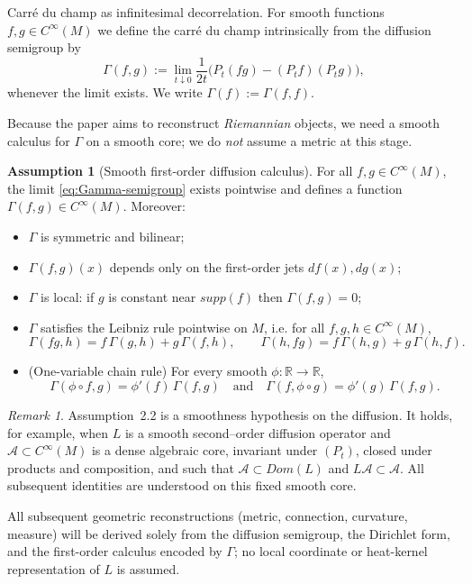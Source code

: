 \documentclass[11pt]{amsart}
\theoremstyle{definition}
\newtheorem{assumption}[theorem]{Assumption}
\theoremstyle{remark}
\newtheorem{remark}[theorem]{Remark}
\newcommand{\supp}{supp}
\newcommand{\Dom}{Dom}
\begin{document}
Carré du champ as infinitesimal decorrelation.
For smooth functions $f,g\in C^\infty(M)$ we define the carré du champ intrinsically
from the diffusion semigroup by
\begin{equation}\label{eq:Gamma-semigroup}
\Gamma(f,g)
:=
\lim_{t\downarrow 0}\frac{1}{2t}
\Big(
P_t(fg) - (P_t f)(P_t g)
\Big),
\end{equation}
whenever the limit exists.
We write $\Gamma(f):=\Gamma(f,f)$.

Because the paper aims to reconstruct \emph{Riemannian} objects, we need a smooth calculus for $\Gamma$
on a smooth core; we do \emph{not} assume a metric at this stage.

\begin{assumption}[Smooth first-order diffusion calculus]
For all $f,g\in C^\infty(M)$, the limit \eqref{eq:Gamma-semigroup} exists pointwise
and defines a function $\Gamma(f,g)\in C^\infty(M)$.
Moreover:
\begin{itemize}
\item $\Gamma$ is symmetric and bilinear;
\item $\Gamma(f,g)(x)$ depends only on the first-order jets $df(x),dg(x)$;
\item $\Gamma$ is local: if $g$ is constant near $\supp(f)$ then $\Gamma(f,g)=0$;
\item $\Gamma$ satisfies the Leibniz  rule pointwise on $M$, i.e. for all $f,g,h\in C^\infty(M)$,
\[
\Gamma(fg,h)=f\,\Gamma(g,h)+g\,\Gamma(f,h),
\qquad
\Gamma(h,fg)=f\,\Gamma(h,g)+g\,\Gamma(h,f).
\]

\item (One-variable chain rule) For every smooth $\phi:\mathbb{R}\to\mathbb{R}$,
\[
\Gamma(\phi\circ f,g)=\phi'(f)\,\Gamma(f,g)
\quad\text{and}\quad
\Gamma(f,\phi\circ g)=\phi'(g)\,\Gamma(f,g).
\]
\end{itemize}
\end{assumption}
\begin{remark}
Assumption~2.2 is a smoothness hypothesis on the diffusion.
It holds, for example, when $L$ is a smooth second--order diffusion operator
and $\mathcal A\subset C^\infty(M)$ is a dense algebraic core, invariant under
$(P_t)$, closed under products and composition, and such that
$\mathcal A\subset\Dom(L)$ and $L\mathcal A\subset\mathcal A$.
All subsequent identities are understood on this fixed smooth core.
\end{remark}


All subsequent geometric reconstructions (metric, connection, curvature, measure)
will be derived solely from the diffusion semigroup, the Dirichlet form, and the
first-order calculus encoded by $\Gamma$; no local coordinate or heat-kernel
representation of $L$ is assumed.
\end{document}
